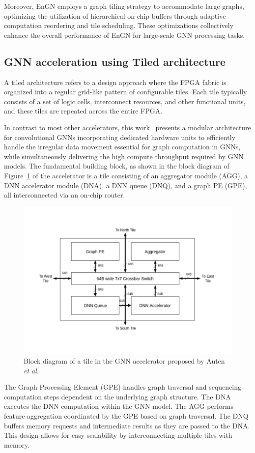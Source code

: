 Moreover, EnGN employs a graph tiling strategy to accommodate large graphs, optimizing the utilization of hierarchical on-chip buffers through adaptive computation reordering and tile scheduling.
These optimizations collectively enhance the overall performance of EnGN for large-scale GNN processing tasks.

\subsection{GNN acceleration using Tiled architecture}
\label{subsec:tiled-architectures}%

A tiled architecture refers to a design approach where the FPGA fabric is organized into a regular grid-like pattern of configurable tiles.
Each tile typically consists of a set of logic cells, interconnect resources, and other functional units, and these tiles are repeated across the entire FPGA.

In contrast to most other accelerators, this work~\cite{9218751} presents a modular architecture for convolutional GNNs incorporating dedicated hardware units to efficiently handle the irregular data movement essential for graph computation in GNNs, while simultaneously delivering the high compute throughput required by GNN models.
The fundamental building block, as shown in the block diagram of Figure~\ref{fig:auten_tile_diagram} of the accelerator is a tile consisting of an aggregator module (AGG), a DNN accelerator module (DNA), a DNN queue (DNQ), and a graph PE (GPE), all interconnected via an on-chip router.

\begin{figure}[t]
    \centering
    \includegraphics[height=0.3\textwidth]{Images/auten_tile_diagram}
    \caption{Block diagram of a tile in the GNN accelerator proposed by Auten \textit{et al.}~\cite{9218751}}
    \label{fig:auten_tile_diagram}
\end{figure}

The Graph Processing Element (GPE) handles graph traversal and sequencing computation steps dependent on the underlying graph structure.
The DNA executes the DNN computation within the GNN model.
The AGG performs feature aggregation coordinated by the GPE based on graph traversal.
The DNQ buffers memory requests and intermediate results as they are passed to the DNA.
This design allows for easy scalability by interconnecting multiple tiles with memory.

